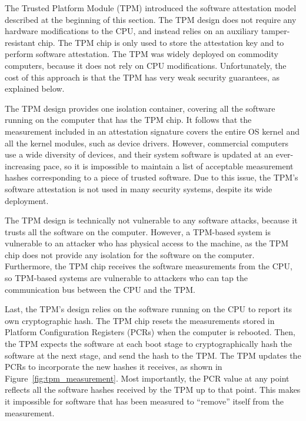 \label{sec:sgx_related_tpm}

The Trusted Platform Module (TPM) \cite{grawrock2003tpm} introduced the
software attestation model described at the beginning of this section. The TPM
design does not require any hardware modifications to the CPU, and instead
relies on an auxiliary tamper-resistant chip. The TPM chip is only used to
store the attestation key and to perform software attestation. The TPM was
widely deployed on commodity computers, because it does not rely on CPU
modifications. Unfortunately, the cost of this approach is that the TPM has
very weak security guarantees, as explained below.

The TPM design provides one isolation container, covering all the software
running on the computer that has the TPM chip. It follows that the measurement
included in an attestation signature covers the entire OS kernel and all the
kernel modules, such as device drivers. However, commercial computers use a
wide diversity of devices, and their system software is updated at an
ever-increasing pace, so it is impossible to maintain a list of acceptable
measurement hashes corresponding to a piece of trusted software. Due to this
issue, the TPM's software attestation is not used in many security systems,
despite its wide deployment.

The TPM design is technically not vulnerable to any software attacks, because
it trusts all the software on the computer. However, a TPM-based system is
vulnerable to an attacker who has physical access to the machine, as the TPM
chip does not provide any isolation for the software on the computer.
Furthermore, the TPM chip receives the software measurements from the CPU,
so TPM-based systems are vulnerable to attackers who can tap the communication
bus between the CPU and the TPM.

Last, the TPM's design relies on the software running on the CPU to report its
own cryptographic hash. The TPM chip resets the measurements stored in Platform
Configuration Registers (PCRs) when the computer is rebooted. Then, the TPM
expects the software at each boot stage to cryptographically hash the software
at the next stage, and send the hash to the TPM. The TPM updates the PCRs to
incorporate the new hashes it receives, as shown in
Figure~\ref{fig:tpm_measurement}. Most importantly, the PCR value at any point
reflects all the software hashes received by the TPM up to that point. This
makes it impossible for software that has been measured to ``remove'' itself
from the measurement.

